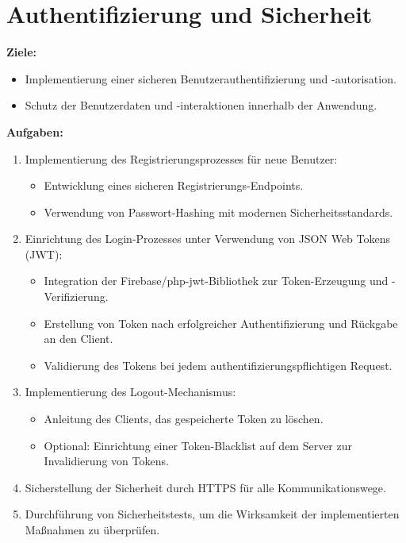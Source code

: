 \documentclass{article}
\begin{document}
\section{Authentifizierung und Sicherheit}
\textbf{Ziele:}
\begin{itemize}
	\item Implementierung einer sicheren Benutzerauthentifizierung und -autorisation.
	\item Schutz der Benutzerdaten und -interaktionen innerhalb der Anwendung.
\end{itemize}
\textbf{Aufgaben:}
\begin{enumerate}
	\item Implementierung des Registrierungsprozesses für neue Benutzer:
	\begin{itemize}
		\item Entwicklung eines sicheren Registrierungs-Endpoints.
		\item Verwendung von Passwort-Hashing mit modernen Sicherheitsstandards.
	\end{itemize}
	\item Einrichtung des Login-Prozesses unter Verwendung von JSON Web Tokens (JWT):
	\begin{itemize}
		\item Integration der Firebase/php-jwt-Bibliothek zur Token-Erzeugung und -Verifizierung.
		\item Erstellung von Token nach erfolgreicher Authentifizierung und Rückgabe an den Client.
		\item Validierung des Tokens bei jedem authentifizierungspflichtigen Request.
	\end{itemize}
	\item Implementierung des Logout-Mechanismus:
	\begin{itemize}
		\item Anleitung des Clients, das gespeicherte Token zu löschen.
		\item Optional: Einrichtung einer Token-Blacklist auf dem Server zur Invalidierung von Tokens.
	\end{itemize}
	\item Sicherstellung der Sicherheit durch HTTPS für alle Kommunikationswege.
	\item Durchführung von Sicherheitstests, um die Wirksamkeit der implementierten Maßnahmen \newline zu überprüfen.
\end{enumerate}
\end{document}
